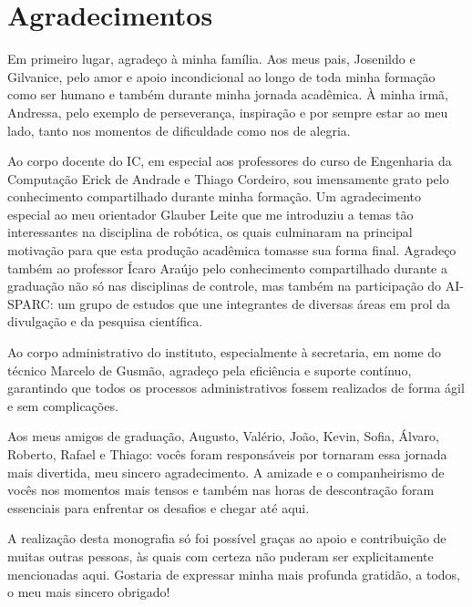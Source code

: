 \chapter*{Agradecimentos}

Em primeiro lugar, agradeço à minha família. Aos meus pais, Josenildo e Gilvanice, 
pelo amor e apoio incondicional ao longo de toda minha formação como ser humano e 
também durante minha jornada acadêmica. À minha irmã, Andressa, pelo exemplo de perseverança,
inspiração e por sempre estar ao meu lado, tanto nos momentos de dificuldade como nos de alegria. 

Ao corpo docente do IC, em especial aos professores do curso de Engenharia da Computação
Erick de Andrade e Thiago Cordeiro, sou imensamente grato pelo conhecimento compartilhado 
durante minha formação. Um agradecimento especial ao meu orientador Glauber Leite que me 
introduziu a temas tão interessantes na disciplina de robótica, os quais culminaram na principal 
motivação para que esta produção acadêmica tomasse sua forma final. Agradeço também ao professor Ícaro Araújo
pelo conhecimento compartilhado durante a graduação não só nas disciplinas de controle, mas também na
participação do AI-SPARC: um grupo de estudos que une integrantes de diversas áreas em prol da divulgação e da pesquisa 
científica.

Ao corpo administrativo do instituto, especialmente à secretaria, em nome do 
técnico Marcelo de Gusmão, agradeço pela eficiência e suporte contínuo, garantindo 
que todos os processos administrativos fossem realizados de forma ágil e 
sem complicações.

Aos meus amigos de graduação, Augusto, Valério, João, Kevin, Sofia, Álvaro, 
Roberto, Rafael e Thiago: vocês foram responsáveis por tornaram essa jornada 
mais divertida, meu sincero agradecimento. A amizade e o companheirismo de 
vocês nos momentos mais tensos e também nas horas de descontração foram essenciais 
para enfrentar os desafios e chegar até aqui.

A realização desta monografia só foi possível graças ao apoio e contribuição 
de muitas outras pessoas, às quais com certeza não puderam ser explicitamente 
mencionadas aqui. Gostaria de expressar minha mais profunda gratidão, a todos, 
o meu mais sincero obrigado!